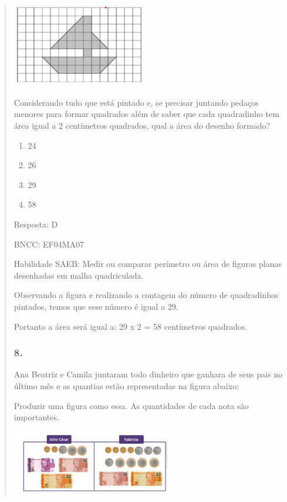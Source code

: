 \begin{enumerate}
\begin{escolha}
\begin{enumerate}
\begin{itemize}
\begin{itemize}
\begin{escolha}
\begin{quote}
\begin{escolha}
{\includegraphics[width=2.32692in,height=1.43990in]{media/image144.png}

Considerando tudo que está pintado e, se precisar juntando pedaços
menores para formar quadrados além de saber que cada quadradinho tem
área igual a 2 centímetros quadrados, qual a área do desenho formado?

\begin{enumerate}
\def\labelenumi{\alph{enumi})}
\item
  24
\item
  26
\item
  29
\item
  58
\end{enumerate}

Resposta: D

BNCC: EF04MA07

Habilidade SAEB: Medir ou comparar perímetro ou área de figuras planas
desenhadas em malha quadriculada.

Observando a figura e realizando a contagem do número de quadradinhos
pintados, temos que esse número é igual a 29.

Portanto a área será igual a: 29 x 2 = 58 centímetros quadrados.

\subsubsection{8.}\label{section-149}

Ana Beatriz e Camila juntaram todo dinheiro que ganhara de seus pais no
último mês e as quantias estão representadas na figura abaixo:

Produzir uma figura como essa. As quantidades de cada nota são
importantes.

\includegraphics[width=2.77564in,height=1.11703in]{media/image145.png}

}
\end{escolha}
\end{quote}
\end{escolha}
\end{itemize}
\end{itemize}
\end{enumerate}
\end{escolha}
\end{enumerate}
